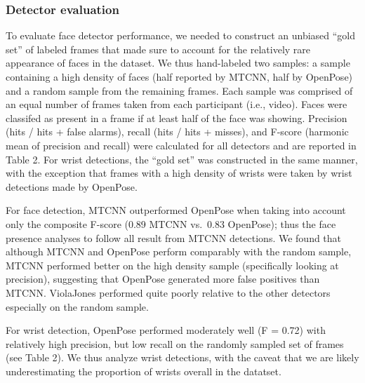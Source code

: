 \documentclass[10pt, letterpaper]{article}
\begin{document}
\subsubsection{Detector evaluation}\label{detector-evaluation}

To evaluate face detector performance, we needed to construct an
unbiased ``gold set'' of labeled frames that made sure to account for
the relatively rare appearance of faces in the dataset. We thus
hand-labeled two samples: a sample containing a high density of faces
(half reported by MTCNN, half by OpenPose) and a random sample from the
remaining frames. Each sample was comprised of an equal number of frames
taken from each participant (i.e., video). Faces were classifed as
present in a frame if at least half of the face was showing. Precision
(hits / hits + false alarms), recall (hits / hits + misses), and F-score
(harmonic mean of precision and recall) were calculated for all
detectors and are reported in Table 2. For wrist detections, the ``gold
set'' was constructed in the same manner, with the exception that frames
with a high density of wrists were taken by wrist detections made by
OpenPose.

For face detection, MTCNN outperformed OpenPose when taking into account
only the composite F-score (0.89 MTCNN vs.~0.83 OpenPose); thus the face
presence analyses to follow all result from MTCNN detections. We found
that although MTCNN and OpenPose perform comparably with the random
sample, MTCNN performed better on the high density sample (specifically
looking at precision), suggesting that OpenPose generated more false
positives than MTCNN. ViolaJones performed quite poorly relative to the
other detectors especially on the random sample.

For wrist detection, OpenPose performed moderately well (F = 0.72) with
relatively high precision, but low recall on the randomly sampled set of
frames (see Table 2). We thus analyze wrist detections, with the caveat
that we are likely underestimating the proportion of wrists overall in
the datatset.
\end{document}
